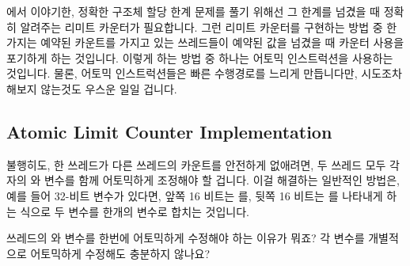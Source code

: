 {\QcountQexactcnt} 에서 이야기한, 정확한 구조체 할당 한계 문제를 풀기 위해선
그 한계를 넘겼을 때 정확히 알려주는 리미트 카운터가 필요합니다.
그런 리미트 카운터를 구현하는 방법 중 한가지는 예약된 카운트를 가지고 있는
쓰레드들이 예약된 값을 넘겼을 때 카운터 사용을 포기하게 하는 것입니다.
이렇게 하는 방법 중 하나는 어토믹 인스트럭션을 사용하는 것입니다.
물론, 어토믹 인스트럭션들은 빠른 수행경로를 느리게 만듭니다만, 시도조차 해보지
않는것도 우스운 일일 겁니다.

\subsection{Atomic Limit Counter Implementation}
\label{sec:count:Atomic Limit Counter Implementation}

불행히도, 한 쓰레드가 다른 쓰레드의 카운트를 안전하게 없애려면, 두 쓰레드 모두
각자의  와  변수를 함께 어토믹하게 조정해야
할 겁니다.
이걸 해결하는 일반적인 방법은, 예를 들어 32-비트 변수가 있다면, 앞쪽 16 비트는
를, 뒷쪽 16 비트는  를 나타내게 하는 식으로 두
변수를 한개의 변수로 합치는 것입니다.

\QuickQuiz{}
	쓰레드의  와  변수를 한번에 어토믹하게
	수정해야 하는 이유가 뭐죠?
	각 변수를 개별적으로 어토믹하게 수정해도 충분하지 않나요?
	\iffalse

